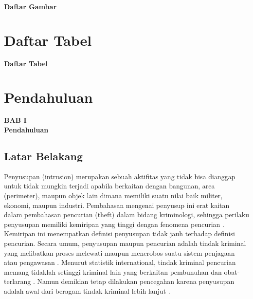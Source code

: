 \documentclass[12pt]{article}
\begin{document}
	\begin{center}
		\textbf{{\large Daftar Gambar}}
	\end{center}

	\listoffigures




\newpage

	\section{Daftar Tabel}
	
	\begin{center}
		\textbf{{\large Daftar Tabel}}
	\end{center}


\newpage
\thispagestyle{plain}
\mbox{}


\newpage
	\setcounter{page}{15}

	\section{Pendahuluan}
	
	\begin{center}
		{\large \textbf{BAB I}} \\
		{\large \textbf{Pendahuluan}}
	\end{center}
	
	\subsection{Latar Belakang}
	
	Penyusupan (intrusion) merupakan sebuah aktifitas yang tidak bisa dianggap untuk tidak mungkin terjadi apabila berkaitan dengan bangunan, area (perimeter), maupun objek lain dimana memiliki suatu nilai baik militer, ekonomi, maupun industri\cite{Assets}.
	Pembahasan mengenai penyusup ini erat kaitan dalam pembahasan pencurian (theft) dalam bidang kriminologi, sehingga perilaku penyusupan memiliki kemiripan yang tinggi dengan fenomena pencurian \cite{Felson1998}.
	Kemiripan ini menempatkan definisi penyusupan tidak jauh terhadap definisi pencurian. Secara umum, penyusupan maupun pencurian adalah tindak kriminal yang melibatkan proses melewati maupun menerobos suatu sistem penjagaan atau pengawasan \cite{Chapman}.
	Menurut statistik international, tindak kriminal pencurian memang tidaklah setinggi kriminal lain yang berkaitan pembunuhan dan obat-terlarang \cite{Frate2010}.
	Namun demikian tetap dilakukan pencegahan karena penyusupan adalah awal dari beragam tindak kriminal lebih lanjut \cite{Nesbit}.
	
\end{document}
